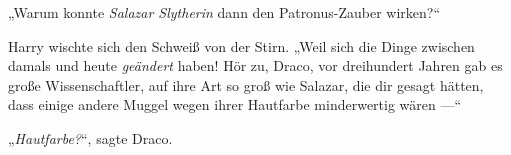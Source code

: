 „Warum konnte \emph{Salazar Slytherin} dann den Patronus-Zauber wirken?“

Harry wischte sich den Schweiß von der Stirn.
„Weil sich die Dinge zwischen damals und heute \emph{geändert} haben! Hör zu, Draco, vor dreihundert Jahren gab es große Wissenschaftler, auf ihre Art so groß wie Salazar, die dir gesagt hätten, dass einige andere Muggel wegen ihrer Hautfarbe minderwertig wären —“

„\emph{Hautfarbe?}“, sagte Draco.

